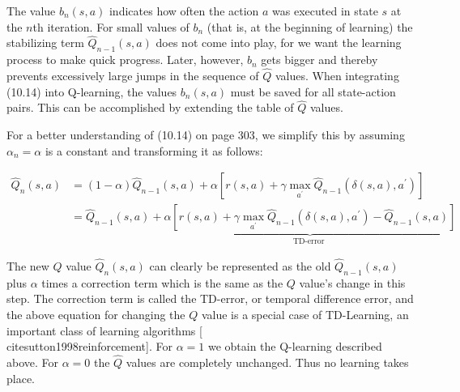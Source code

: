 \documentclass[10pt]{book}
\begin{document}
The value $b_{n}(s, a)$ indicates how often the action $a$ was executed in state $s$ at the $n$th iteration. For small values of $b_{n}$ (that is, at the beginning of learning) the stabilizing term $\hat{Q}_{n-1}(s, a)$ does not come into play, for we want the learning process to make quick progress. Later, however, $b_{n}$ gets bigger and thereby prevents excessively large jumps in the sequence of $\hat{Q}$ values. When integrating (10.14) into Q-learning, the values $b_{n}(s, a)$ must be saved for all state-action pairs. This can be accomplished by extending the table of $\hat{Q}$ values.

For a better understanding of (10.14) on page 303, we simplify this by assuming $\alpha_{n}=\alpha$ is a constant and transforming it as follows:


$$
\begin{aligned}
\hat{Q}_{n}(s, a) & =(1-\alpha) \hat{Q}_{n-1}(s, a)+\alpha\left[r(s, a)+\gamma \max _{a^{\prime}} \hat{Q}_{n-1}\left(\delta(s, a), a^{\prime}\right)\right] \\
& =\hat{Q}_{n-1}(s, a)+\underbrace{\alpha\left[r(s, a)+\gamma \max _{a^{\prime}} \hat{Q}_{n-1}\left(\delta(s, a), a^{\prime}\right)-\hat{Q}_{n-1}(s, a)\right]}_{\text {TD-error }}
\end{aligned}
$$

The new $Q$ value $\hat{Q}_{n}(s, a)$ can clearly be represented as the old $\hat{Q}_{n-1}(s, a)$ plus $\alpha$ times a correction term which is the same as the $Q$ value's change in this step. The correction term is called the TD-error, or temporal difference error, and the above equation for changing the $Q$ value is a special case of TD-Learning, an important class of learning algorithms [\\cite{sutton1998reinforcement}]. For $\alpha=1$ we obtain the Q-learning described above. For $\alpha=0$ the $\hat{Q}$ values are completely unchanged. Thus no learning takes place.
\end{document}

